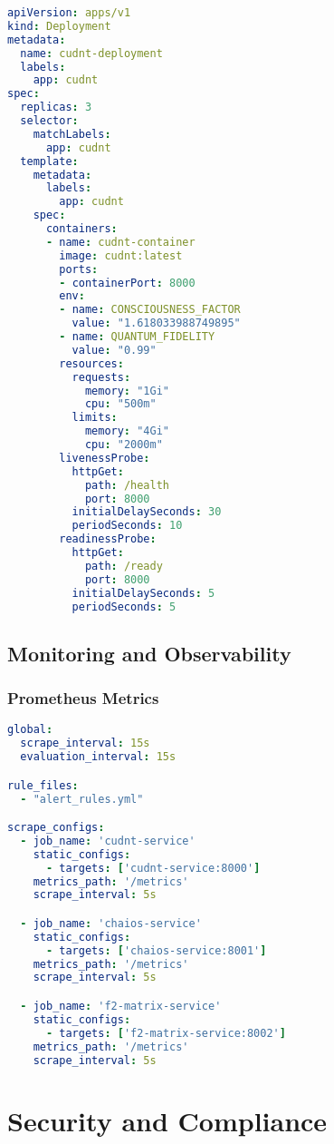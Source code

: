 \documentclass[11pt,a4paper]{article}
\begin{document}
\begin{lstlisting}[language=YAML, caption=Kubernetes Deployment Manifest]
apiVersion: apps/v1
kind: Deployment
metadata:
  name: cudnt-deployment
  labels:
    app: cudnt
spec:
  replicas: 3
  selector:
    matchLabels:
      app: cudnt
  template:
    metadata:
      labels:
        app: cudnt
    spec:
      containers:
      - name: cudnt-container
        image: cudnt:latest
        ports:
        - containerPort: 8000
        env:
        - name: CONSCIOUSNESS_FACTOR
          value: "1.618033988749895"
        - name: QUANTUM_FIDELITY
          value: "0.99"
        resources:
          requests:
            memory: "1Gi"
            cpu: "500m"
          limits:
            memory: "4Gi"
            cpu: "2000m"
        livenessProbe:
          httpGet:
            path: /health
            port: 8000
          initialDelaySeconds: 30
          periodSeconds: 10
        readinessProbe:
          httpGet:
            path: /ready
            port: 8000
          initialDelaySeconds: 5
          periodSeconds: 5
\end{lstlisting}

\subsection{Monitoring and Observability}

\subsubsection{Prometheus Metrics}

\begin{lstlisting}[language=YAML, caption=Prometheus Monitoring Configuration]
global:
  scrape_interval: 15s
  evaluation_interval: 15s

rule_files:
  - "alert_rules.yml"

scrape_configs:
  - job_name: 'cudnt-service'
    static_configs:
      - targets: ['cudnt-service:8000']
    metrics_path: '/metrics'
    scrape_interval: 5s

  - job_name: 'chaios-service'
    static_configs:
      - targets: ['chaios-service:8001']
    metrics_path: '/metrics'
    scrape_interval: 5s

  - job_name: 'f2-matrix-service'
    static_configs:
      - targets: ['f2-matrix-service:8002']
    metrics_path: '/metrics'
    scrape_interval: 5s
\end{lstlisting}

\section{Security and Compliance}
\end{document}

